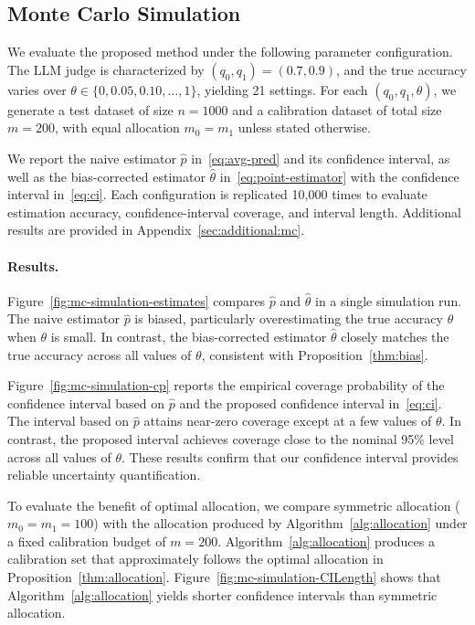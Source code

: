 \subsection{Monte Carlo Simulation}
We evaluate the proposed method under the following parameter configuration. The LLM judge is characterized by $(q_0, q_1) = (0.7, 0.9)$, and the true accuracy varies over $\theta \in \{0, 0.05, 0.10, \ldots, 1\}$, yielding 21 settings. For each $(q_0, q_1, \theta)$, we generate a test dataset of size $n=1000$ and a calibration dataset of total size $m=200$, with equal allocation $m_0=m_1$ unless stated otherwise.

We report the naive estimator $\hat{p}$ in~\eqref{eq:avg-pred} and its confidence interval, as well as the bias-corrected estimator $\hat{\theta}$ in~\eqref{eq:point-estimator} with the confidence interval in~\eqref{eq:ci}. Each configuration is replicated 10{,}000 times to evaluate estimation accuracy, confidence-interval coverage, and interval length.  Additional results are provided in Appendix~\ref{sec:additional:mc}.



\paragraph{Results.}
Figure~\ref{fig:mc-simulation-estimates} compares $\hat{p}$ and $\hat{\theta}$ in a single simulation run. The naive estimator $\hat{p}$ is biased, particularly overestimating the true accuracy $\theta$ when $\theta$ is small. In contrast, the bias-corrected estimator $\hat{\theta}$ closely matches the true accuracy across all values of $\theta$, consistent with Proposition~\ref{thm:bias}.

Figure~\ref{fig:mc-simulation-cp} reports the empirical coverage probability of the confidence interval based on $\hat{p}$ and the proposed confidence interval in~\eqref{eq:ci}. The interval based on $\hat{p}$ attains near-zero coverage except at a few values of $\theta$. In contrast, the proposed interval achieves coverage close to the nominal 95\% level across all values of $\theta$. These results confirm that our confidence interval provides reliable uncertainty quantification.

To evaluate the benefit of optimal allocation, we compare symmetric allocation ($m_0=m_1=100$) with the allocation produced by Algorithm~\ref{alg:allocation} under a fixed calibration budget of $m=200$. Algorithm~\ref{alg:allocation} produces a calibration set that approximately follows the optimal allocation in Proposition~\ref{thm:allocation}. Figure~\ref{fig:mc-simulation-CILength} shows that Algorithm~\ref{alg:allocation} yields shorter confidence intervals than symmetric allocation.


